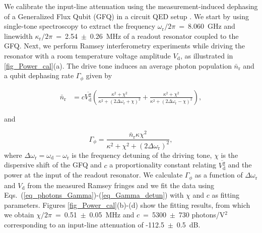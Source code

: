 \documentclass[%
reprint,
floatfix,
superscriptaddress,
amsmath,amssymb,
aps,
pra,
]{revtex4-2}
\begin{document}
We calibrate the input-line attenuation using the measurement-induced dephasing of a Generalized Flux Qubit (GFQ) in a circuit QED setup \cite{Geisert2024Aug}. We start by using single-tone spectroscopy to extract the frequency $\omega\mathrm{_r}/2\pi$~=~8.060~GHz and linewidth $\kappa\mathrm{_r}/2\pi$~=~2.54~$\pm$~0.26~MHz of a readout resonator coupled to the GFQ. Next, we perform Ramsey interferometry experiments while driving the resonator with a room temperature voltage amplitude $V\mathrm{_d}$, as illustrated in \cref{fig_Power_cal}(a). The drive tone induces an average photon population $\bar{n}\mathrm{_r}$ and a qubit dephasing rate $\Gamma_{\phi}$ given by \cite{Gambetta2006Oct} 

\begin{equation}
\begin{aligned}
\bar{n}\mathrm{_r} & = c\overline{V\mathrm{^2_{d}}}\left(\frac{\kappa^2+\chi^2}{\kappa^2+ \left(2\Delta\omega\mathrm{_r}
 +\chi\right)^2}+\frac{\kappa^2+\chi^2}{\kappa^2+\left(2\Delta\omega\mathrm{_r}-\chi\right)^2}\right),
\end{aligned}
\label{eq_photons_Gamma}
\end{equation}

and

\begin{equation}
\Gamma_{\phi}  = \frac{\bar{n}\mathrm{_r} \kappa\chi^2}{\kappa^2+\chi^2+\left(2\Delta\omega\mathrm{_r}\right)^2},
\label{eq_Gamma_detun}
\end{equation}
%
where $\Delta\omega\mathrm{_r}=\omega\mathrm{_d}-\omega\mathrm{_r}$ is the frequency detuning of the driving tone, $\chi$ is the dispersive shift of the GFQ and $c$ a proportionality constant relating $\overline{V\mathrm{^2_{d}}}$ and the power at the input of the readout resonator. We calculate $\Gamma_{\phi}$ as a function of $\Delta\omega\mathrm{_r}$ and $V\mathrm{_d}$ from the measured Ramsey fringes and we fit the data using Eqs.~(\ref{eq_photons_Gamma})-(\ref{eq_Gamma_detun}) with $\chi$ and $c$ as fitting parameters. Figures \ref{fig_Power_cal}(b)-(d) show the fitting results, from which we obtain $\chi/2\pi$~=~0.51~$\pm$~0.05~MHz and $c$~=~5300~$\pm$~730 photons/V$\mathrm{^2}$ corresponding to an input-line attenuation of -112.5~$\pm$~0.5~dB. 
\end{document}
